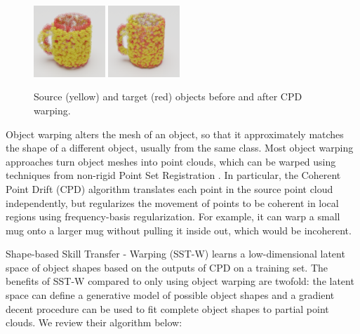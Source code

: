 \documentclass{article}
\begin{document}
\begin{figure}
    \centering
    \vspace{-2em}
    \includegraphics[width=0.24\textwidth]{figures/blender/warp1/canon_over_orig.png}
    \includegraphics[width=0.24\textwidth]{figures/blender/warp1/warped_over_orig.png}
    \caption{Source (yellow) and target (red) objects before and after CPD warping.}
    \label{fig:obj_warp}
    \vspace{-1em}
\end{figure}
Object warping alters the mesh of an object, so that it approximately matches the shape of a different object, usually from the same class. Most object warping approaches turn object meshes into point clouds, which can be warped using techniques from non-rigid Point Set Registration \cite{zhu19Review}. In particular, the Coherent Point Drift (CPD) algorithm \cite{myronenko10point} translates each point in the source point cloud independently, but regularizes the movement of points to be coherent in local regions using frequency-basis regularization. For example, it can warp a small mug onto a larger mug without pulling it inside out, which would be incoherent.

Shape-based Skill Transfer - Warping (SST-W) \cite{thompson21ShapeBased} learns a low-dimensional latent space of object shapes based on the outputs of CPD on a training set. The benefits of SST-W compared to only using object warping are twofold: the latent space can define a generative model of possible object shapes and a gradient decent procedure can be used to fit complete object shapes to partial point clouds. We review their algorithm below:
\end{document}
